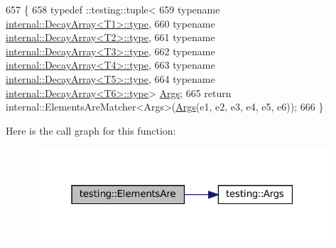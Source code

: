 \begin{DoxyCode}
657                                 \{
658   typedef ::testing::tuple<
659       \textcolor{keyword}{typename} \hyperlink{namespacegenerate__debs_a50bc9a7ecac9584553e089a448bcde58}{internal::DecayArray<T1>::type},
660       \textcolor{keyword}{typename} \hyperlink{namespacegenerate__debs_a50bc9a7ecac9584553e089a448bcde58}{internal::DecayArray<T2>::type},
661       \textcolor{keyword}{typename} \hyperlink{namespacegenerate__debs_a50bc9a7ecac9584553e089a448bcde58}{internal::DecayArray<T3>::type},
662       \textcolor{keyword}{typename} \hyperlink{namespacegenerate__debs_a50bc9a7ecac9584553e089a448bcde58}{internal::DecayArray<T4>::type},
663       \textcolor{keyword}{typename} \hyperlink{namespacegenerate__debs_a50bc9a7ecac9584553e089a448bcde58}{internal::DecayArray<T5>::type},
664       \textcolor{keyword}{typename} \hyperlink{namespacegenerate__debs_a50bc9a7ecac9584553e089a448bcde58}{internal::DecayArray<T6>::type}> 
      \hyperlink{namespacetesting_a09ac462e8d6ed468cbfaa9c767aee0aa}{Args};
665   \textcolor{keywordflow}{return} internal::ElementsAreMatcher<Args>(\hyperlink{namespacetesting_a09ac462e8d6ed468cbfaa9c767aee0aa}{Args}(e1, e2, e3, e4, e5, e6));
666 \}
\end{DoxyCode}
Here is the call graph for this function\+:
\nopagebreak
\begin{figure}[H]
\begin{center}
\leavevmode
\includegraphics[width=313pt]{namespacetesting_a725b7a52e5eea9fe8f4ce46be6fd7159_cgraph}
\end{center}
\end{figure}
\mbox{\label{namespacetesting_a3af9f549d951a4961825f821e6d47da9}} 
